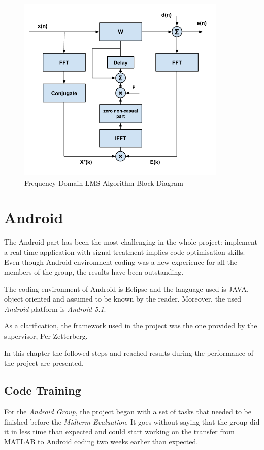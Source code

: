 \documentclass[11pt,a4paper,english]{book}  %
\theoremstyle{definition}  %
\theoremstyle{plain}  %
\theoremstyle{remark}  %
\begin{document}
		\begin{figure}[h]
		\centering
		\includegraphics[width=10cm]{images/theory/freqlms.jpg}
		\caption{Frequency Domain LMS-Algorithm Block Diagram}
		\label{fig:freqlms}
		\end{figure}


\chapter{Android}

The Android part has been the most challenging in the whole project: implement a real time application with signal treatment implies code optimisation skills. Even though Android environment coding was a new experience for all the members of the group, the results have been outstanding.

The coding environment of Android is Eclipse and the language used is JAVA, object oriented and assumed to be known by the reader. Moreover, the used \textit{Android} platform is \textit{Android 5.1}. 

As a clarification, the framework used in the project was the one provided by the supervisor, Per Zetterberg.

In this chapter the followed steps and reached results during the performance of the project are presented. 

\section{Code Training}

For the \textit{Android Group}, the project began with a set of tasks that needed to be finished before the \textit{Midterm Evaluation}. It goes without saying that the group did it in less time than expected and could start working on the transfer from MATLAB to Android coding two weeks earlier than expected.
\end{document}
